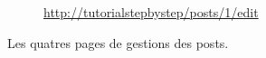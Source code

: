 \begin{figure}[!h]
\begin{subfigure}[c]{0.24\textwidth}
    \end{subfigure}
    \begin{subfigure}[c]{0.73\textwidth}
    \end{subfigure}\hfill
    \begin{subfigure}[c]{0.24\textwidth}
        \caption{\url{http://tutorialstepbystep/posts/1/edit}}
    \end{subfigure}
    \caption{Les quatres pages de gestions des posts.}
\end{figure}

\newpage
